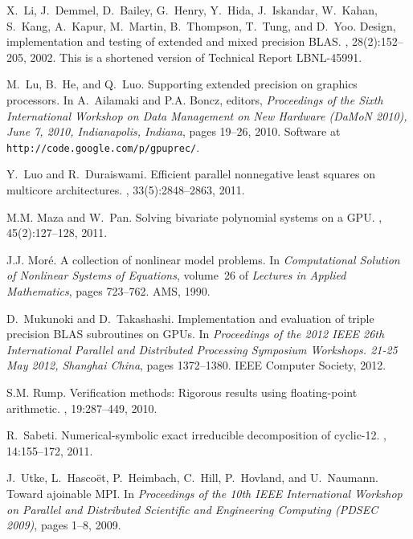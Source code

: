 \documentclass{article}
\begin{document}
\begin{thebibliography}{10}
X.~Li, J.~Demmel, D.~Bailey, G.~Henry, Y.~Hida, J.~Iskandar, W.~Kahan, S.~Kang,
  A.~Kapur, M.~Martin, B.~Thompson, T.~Tung, and D.~Yoo.
\newblock Design, implementation and testing of extended and mixed precision
  {BLAS}.
, 28(2):152--205, 2002.
\newblock This is a shortened version of Technical Report LBNL-45991.

M.~Lu, B.~He, and Q.~Luo.
\newblock Supporting extended precision on graphics processors.
\newblock In A.~Ailamaki and P.A. Boncz, editors, {\em Proceedings of the Sixth
  International Workshop on Data Management on New Hardware (DaMoN 2010), June
  7, 2010, Indianapolis, Indiana}, pages 19--26, 2010.
\newblock Software at {\tt http://code.google.com/p/gpuprec/}.

Y.~Luo and R.~Duraiswami.
\newblock Efficient parallel nonnegative least squares on multicore
  architectures.
, 33(5):2848--2863, 2011.

M.M. Maza and W.~Pan.
\newblock Solving bivariate polynomial systems on a {GPU}.
, 45(2):127--128, 2011.

J.J. Mor{\'{e}}.
\newblock A collection of nonlinear model problems.
\newblock In {\em Computational Solution of Nonlinear Systems of Equations},
  volume~26 of {\em Lectures in Applied Mathematics}, pages 723--762. AMS,
  1990.

D.~Mukunoki and D.~Takashashi.
\newblock Implementation and evaluation of triple precision {BLAS} subroutines
  on {GPU}s.
\newblock In {\em Proceedings of the 2012 IEEE 26th International Parallel and
  Distributed Processing Symposium Workshops. 21-25 May 2012, Shanghai China},
  pages 1372--1380. IEEE Computer Society, 2012.

S.M. Rump.
\newblock Verification methods: Rigorous results using floating-point
  arithmetic.
, 19:287–449, 2010.

R.~Sabeti.
\newblock Numerical-symbolic exact irreducible decomposition of cyclic-12.
, 14:155--172, 2011.

J.~Utke, L.~Hasco{\"{e}}t, P.~Heimbach, C.~Hill, P.~Hovland, and U.~Naumann.
\newblock Toward ajoinable {MPI}.
\newblock In {\em Proceedings of the 10th IEEE International Workshop on
  Parallel and Distributed Scientific and Engineering Computing (PDSEC 2009)},
  pages 1--8, 2009.


\end{thebibliography}
\end{document}
